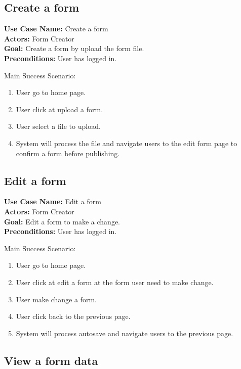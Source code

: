 \documentclass[12pt,oneside,openright,a4paper]{cpe-english-project}
\begin{document}
\subsection{Create a form}

\textbf{Use Case Name:} Create a form \\
\textbf{Actors:} Form Creator\\
\textbf{Goal:} Create a form by upload the form file. \\
\textbf{Preconditions:} User has logged in.

Main Success Scenario: 

\begin{enumerate}
    \item User go to home page.
    \item User click at upload a form.
    \item User select a file to upload.
    \item System will process the file and navigate users to the edit form page to confirm a form before publishing.
   
\end{enumerate}

\subsection{Edit a form}

\textbf{Use Case Name:} Edit a form \\
\textbf{Actors:} Form Creator\\
\textbf{Goal:} Edit a form to make a change.\\
\textbf{Preconditions:} User has logged in.

Main Success Scenario: 

\begin{enumerate}
    \item User go to home page.
    \item User click at edit a form at the form user need to make change.
    \item User make change a form.
    \item User click back to the previous page.
    \item System will process autosave and navigate users to the previous page.
\end{enumerate}


\subsection{View a form data}
\end{document}
